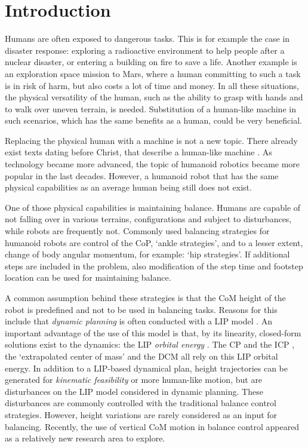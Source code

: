 %
\chapter{Introduction} \label{chap::intro}
Humans are often exposed to dangerous tasks. This is for example the case in disaster response: exploring a radioactive environment to help people after a nuclear disaster, or entering a building on fire to save a life. Another example is an exploration space mission to Mars, where a human committing to such a task is in risk of harm, but also costs a lot of time and money. In all these situations, the physical versatility of the human, such as the ability to grasp with hands and to walk over uneven terrain, is needed. Substitution of a human-like machine in such scenarios, which has the same benefits as a human, could be very beneficial. 

Replacing the physical human with a machine is not a new topic. There already exist texts dating before Christ, that describe a human-like machine \cite{behnke2008humanoid}. As technology became more advanced, the topic of humanoid robotics became more popular in the last decades. However, a humanoid robot that has the same physical capabilities as an average human being still does not exist. 

One of those physical capabilities is maintaining balance. Humans are capable of not falling over in various terrains, configurations and subject to disturbances, while robots are frequently not. Commonly used balancing strategies for humanoid robots are control of the \ac{CoP}, `ankle strategies', and to a lesser extent, change of body angular momentum, for example: `hip strategies'. If additional steps are included in the problem, also modification of the step time and footstep location can be used for maintaining balance. 

A common assumption behind these strategies is that the \ac{CoM} height of the robot is predefined and not to be used in balancing tasks. Reasons for this include that \textit{dynamic planning} is often conducted with a \ac{LIP} model \cite{kajita20013d}. An important advantage of the use of this model is that, by its linearity, closed-form solutions exist to the dynamics: the \ac{LIP} \textit{orbital energy} \cite{kajita1992dynamic}. The \ac{CP} \cite{pratt2006capture} and the \ac{ICP} \cite{koolen2012capturability}, the `extrapolated center of mass' \cite{hof2008extrapolated} and the \ac{DCM} \cite{takenaka2009real} all rely on this \ac{LIP} orbital energy. In addition to a \ac{LIP}-based dynamical plan, height trajectories can be generated for \textit{kinematic feasibility} or more human-like motion, but are disturbances on the \ac{LIP} model considered in dynamic planning. These disturbances are commonly controlled with the traditional balance control strategies. However, height variations are rarely considered as an input for balancing. Recently, the use of vertical \ac{CoM} motion in balance control appeared as a relatively new research area to explore.

